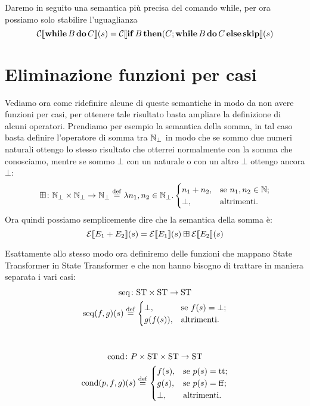 Daremo in seguito una semantica più precisa del comando while, per ora possiamo solo stabilire l'uguaglianza
$$\mathcal{C} \llbracket \mathop{\textup{\textbf{while}}} B \mathop{\textup{\textbf{do}}} C \rrbracket (s) = \mathcal{C} \llbracket \mathop{\textup{\textbf{if}}} B \mathop{\textup{\textbf{then}}} (C ; \mathop{\textup{\textbf{while}}} B \mathop{\textup{\textbf{do}}} C \mathop{\textup{\textbf{else}}} \mathop{\textup{\textbf{skip}}} \rrbracket (s)$$

\section{Eliminazione funzioni per casi}
\label{sec:definizione di F}
Vediamo ora come ridefinire alcune di queste semantiche in modo da non avere funzioni per casi, per ottenere tale risultato basta ampliare la definizione di alcuni operatori. Prendiamo per esempio la semantica della somma, in tal caso basta definire l'operatore di somma tra $\mathbb{N}_\bot$ in modo che se sommo due numeri naturali ottengo lo stesso risultato che otterrei normalmente con la somma che conosciamo, mentre se sommo $\bot$ con un naturale o con un altro $\bot$ ottengo ancora $\bot$:
$$\fund{\conadd}{\Nset_\bot \times \Nset_\bot}{\Nset_\bot} \defeq \lambda n_1, n_2 \in \Nset_\bot . \begin{cases}
        n_1 + n_2, &\text{se $n_1, n_2 \in \Nset$;}\\
        \bot, &\text{altrimenti.}
        \end{cases}$$
Ora quindi possiamo semplicemente dire che la semantica della somma è:
$$\mathcal{E} \llbracket E_1 + E_2 \rrbracket (s) = \mathcal{E} \llbracket E_1 \rrbracket (s) \mathbin{\boxplus} \mathcal{E} \llbracket E_2 \rrbracket (s)$$

Esattamente allo stesso modo ora definiremo delle funzioni che mappano State Transformer in State Transformer e che non hanno bisogno di trattare in maniera separata i vari casi:
\begin{gather*}
\fund{\mathrm{seq}}{\ST \times \ST}{\ST} \\
\mathrm{seq}(f,g)(s) \defeq \begin{cases}
        \bot, &\text{se $f(s) = \bot$;}\\
        g(f(s)), &\text{altrimenti.}
        \end{cases}\\
\pts
\fund{\mathrm{cond}}{P \times \ST \times \ST}{\ST} \\
\mathrm{cond}(p,f,g)(s) \defeq \begin{cases}
        f(s), &\text{se $p(s) = \ttv$;}\\
        g(s), &\text{se $p(s) = \ffv$;}\\
        \bot, &\text{altrimenti.}
        \end{cases}\\
\end{gather*}

